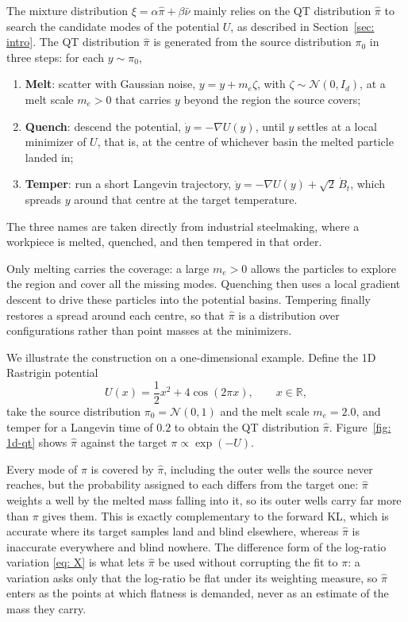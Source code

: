 \documentclass{article}
\begin{document}
The mixture distribution $\xi = \alpha\hat\pi+\beta\bar\nu$ mainly relies on the QT distribution $\hat\pi$ to search the candidate modes of the potential $U$, as described in Section~\ref{sec: intro}. The QT distribution $\hat\pi$ is generated from the source distribution $\pi_0$ in three steps: for each $y\sim \pi_0$,
\begin{enumerate}
	\setlength{\itemsep}{0pt}
	\item \textbf{Melt}: scatter with Gaussian noise, $y = y+m_e\zeta$, with $\zeta\sim \mathcal N(0,I_d)$, at a melt scale $m_e>0$ that carries $y$ beyond the region the source covers;
	\item \textbf{Quench}: descend the potential, $\dot y = -\nabla U(y)$, until $y$ settles at a local minimizer of $U$, that is, at the centre of whichever basin the melted particle landed in;
	\item \textbf{Temper}: run a short Langevin trajectory, $\dot y = -\nabla U(y)+\sqrt 2\,\dot B_t$, which spreads $y$ around that centre at the target temperature.
\end{enumerate}
The three names are taken directly from industrial steelmaking, where a workpiece is melted, quenched, and then tempered in that order.

Only melting carries the coverage: a large $m_e>0$ allows the particles to explore the region and cover all the missing modes. Quenching then uses a local gradient descent to drive these particles into the potential basins. Tempering finally restores a spread around each centre, so that $\hat\pi$ is a distribution over configurations rather than point masses at the minimizers.

We illustrate the construction on a one-dimensional example. Define the 1D Rastrigin potential
\begin{equation*}
	U(x) = \frac12x^2+4\cos(2\pi x), \qquad x\in \mathbb R,
\end{equation*}
take the source distribution $\pi_0 = \mathcal N(0,1)$ and the melt scale $m_e=2.0$, and temper for a Langevin time of $0.2$ to obtain the QT distribution $\hat\pi$. Figure~\ref{fig: 1d-qt} shows $\hat\pi$ against the target $\pi\propto\exp(-U)$.

Every mode of $\pi$ is covered by $\hat\pi$, including the outer wells the source never reaches, but the probability assigned to each differs from the target one: $\hat\pi$ weights a well by the melted mass falling into it, so its outer wells carry far more than $\pi$ gives them. This is exactly complementary to the forward KL, which is accurate where its target samples land and blind elsewhere, whereas $\hat\pi$ is inaccurate everywhere and blind nowhere. The difference form of the log-ratio variation \eqref{eq: X} is what lets $\hat\pi$ be used without corrupting the fit to $\pi$: a variation asks only that the log-ratio be flat under its weighting measure, so $\hat\pi$ enters as the points at which flatness is demanded, never as an estimate of the mass they carry.
\end{document}
